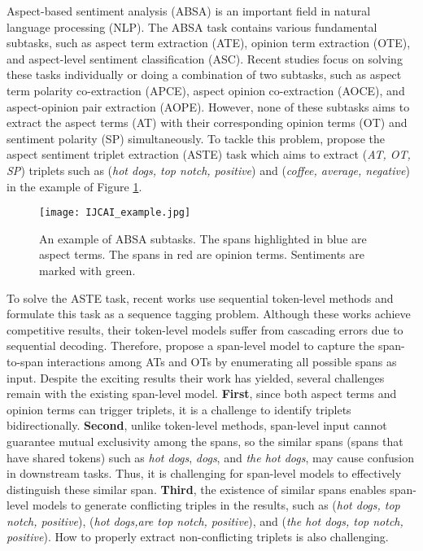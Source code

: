 \documentclass[11pt]{article}
\begin{document}
Aspect-based sentiment analysis (ABSA) is an important field in natural language processing (NLP). The ABSA task contains various fundamental subtasks, such as aspect term extraction (ATE), opinion term extraction (OTE), and aspect-level sentiment classification (ASC). Recent studies focus on solving these tasks individually or doing a combination of two subtasks, such as aspect term polarity co-extraction (APCE), aspect opinion co-extraction (AOCE), and aspect-opinion pair extraction (AOPE). However, none of these subtasks aims to extract the aspect terms (AT) with their corresponding opinion terms (OT) and sentiment polarity (SP) simultaneously. To tackle this problem, \cite{DBLP:conf/aaai/PengXBHLS20} propose the aspect sentiment triplet extraction (ASTE) task which aims to extract (\emph{AT, OT, SP}) triplets such as (\emph{hot dogs, top notch, positive}) and (\emph{coffee, average, negative}) in the example of Figure \ref{example}. 

\begin{figure} [t]
	\centering
	\texttt{[image: IJCAI\_example.jpg]}
	\caption{An example of ABSA subtasks. The spans highlighted in blue are aspect terms. The spans in red are opinion terms. Sentiments are marked with green.}
	\label{example}
\end{figure}

To solve the ASTE task, recent works \cite{DBLP:conf/aaai/PengXBHLS20,DBLP:journals/corr/abs-2010-04640,DBLP:conf/aaai/MaoSYC21} use sequential token-level methods and formulate this task as a sequence tagging problem. Although these works achieve competitive results, their token-level models suffer from cascading errors due to sequential decoding. Therefore, \cite{DBLP:conf/acl/XuCB20} propose a span-level model to capture the span-to-span interactions among ATs and OTs by enumerating all possible spans as input. Despite the exciting results their work has yielded, several challenges remain with the existing span-level model. \textbf{First}, since both aspect terms and opinion terms can trigger triplets, it is a challenge to identify triplets bidirectionally. \textbf{Second}, unlike token-level methods, span-level input cannot guarantee mutual exclusivity among the spans, so the similar spans (spans that have shared tokens) such as \emph{hot dogs}, \emph{dogs}, and \emph{the hot dogs}, may cause confusion in downstream tasks. Thus, it is challenging for span-level models to effectively distinguish these similar span. \textbf{Third}, the existence of similar spans enables span-level models to generate conflicting triples in the results, such as (\emph{hot dogs, top notch, positive}), (\emph{hot dogs,are top notch, positive}), and (\emph{the hot dogs, top notch, positive}). How to properly extract non-conflicting triplets is also challenging.
\end{document}
